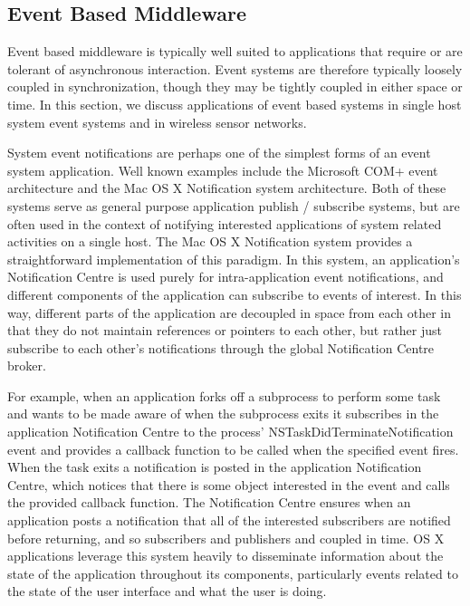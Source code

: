 \documentclass{acm_proc_article-sp}
\begin{document}

\subsection{Event Based Middleware}

Event based middleware is typically well suited to applications that require or are tolerant of asynchronous interaction. Event systems are therefore typically loosely coupled in synchronization, though they may be tightly coupled in either space or time. In this section, we discuss applications of event based systems in single host system event systems and in wireless sensor networks.

System event notifications are perhaps one of the simplest forms of an event system application. Well known examples include the Microsoft COM+ event architecture and the Mac OS X Notification system architecture. Both of these systems serve as general purpose application publish / subscribe systems, but are often used in the context of notifying interested applications of system related activities on a single host. The Mac OS X Notification system \cite{nsnotification} provides a straightforward implementation of this paradigm. In this system, an application's Notification Centre is used purely for intra-application event notifications, and different components of the application can subscribe to events of interest. In this way, different parts of the application are decoupled in space from each other in that they do not maintain references or pointers to each other, but rather just subscribe to each other's notifications through the global Notification Centre broker. 

For example, when an application forks off a subprocess to perform some task and wants to be made aware of when the subprocess exits it subscribes in the application Notification Centre to the process' NSTaskDidTerminateNotification event and provides a callback function to be called when the specified event fires. When the task exits a notification is posted in the application Notification Centre, which notices that there is some object interested in the event and calls the provided callback function. The Notification Centre ensures when an application posts a notification that all of the interested subscribers are notified before returning, and so subscribers and publishers and coupled in time. OS X applications leverage this system heavily to disseminate information about the state of the application throughout its components, particularly events related to the state of the user interface and what the user is doing. 
\end{document}
